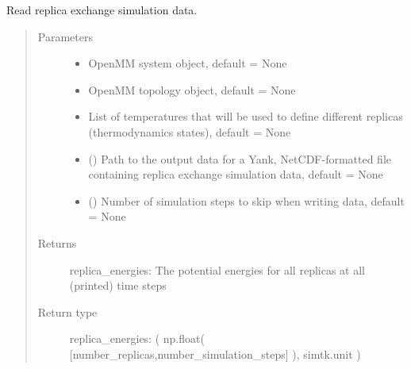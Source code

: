 \documentclass[letterpaper,12pt,english,openany,oneside]{sphinxmanual}
\begin{document}
\begin{fulllineitems}
\label{\detokenize{simulation:simulation.rep_exch.read_replica_exchange_data}}
Read replica exchange simulation data.
\begin{quote}\begin{description}
\item[{Parameters}] \leavevmode\begin{itemize}
\item {} 
 \textendash{} OpenMM system object, default = None

\item {} 
 \textendash{} OpenMM topology object, default = None

\item {} 
 \textendash{} List of temperatures that will be used to define different replicas (thermodynamics states), default = None

\item {} 
 () \textendash{} Path to the output data for a Yank, NetCDF-formatted file containing replica exchange simulation data, default = None

\item {} 
 () \textendash{} Number of simulation steps to skip when writing data, default = None

\end{itemize}

\item[{Returns}] \leavevmode
replica\_energies: The potential energies for all replicas at all (printed) time steps

\item[{Return type}] \leavevmode

replica\_energies:  ( np.float( {[}number\_replicas,number\_simulation\_steps{]} ), simtk.unit )



\end{description}
\end{quote}
\end{fulllineitems}
\end{document}
